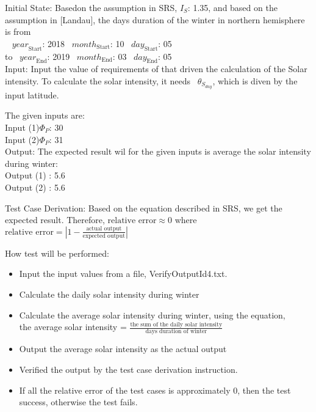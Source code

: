 \documentclass[12pt, titlepage]{article}
\begin{document}
\begin{enumerate}
Initial State:
Basedon the assumption in SRS\cite{YS2019}, $I_{S}$: 1.35, and based on the
assumption in [Landau\cite{Charles2001}], the days duration of the winter in
northern hemisphere is from\\
~ $\mathit{year}_\text{Start}$: 2018
~$\mathit{month}_\text{Start}$: 10 
~$\mathit{day}_\text{Start}$: 05 \\
 to
~$\mathit{year}_\text{End}$: 2019 
~$\mathit{month}_\text{End}$: 03
~$\mathit{day}_\text{End}$: 05\\

 Input: Input the value of requirements of
\progname that driven the calculation of the Solar intensity. To calculate the
solar intensity, it needs ~$\theta_{S_{day}}$, which is diven by the input
latitude. 

The given inputs are:\\ 
Input (1)$\Phi_P$: 30 \\ 
Input (2)$\Phi_P$: 31\\

Output: The expected result wil for the given inputs is average the solar
intensity during winter:\\ 
Output (1) : 5.6\\ 
Output (2) : 5.6\\



Test Case Derivation: Based on the equation described in SRS\cite{YS2019}, we
get the expected result. Therefore, $\text{relative error} \approx 0$ where
$\text{relative error} = | 1 - \frac{\text{actual output}}{ \text{expected
output}} |$ 


How test will be performed: 

\begin{itemize} 
\item Input the input values from a file, VerifyOutputId4.txt. 
\item Calculate the daily solar intensity during winter 
\item Calculate the average solar intensity during winter, using the equation,\\the average solar intensity = $\frac{\text{the sum of the daily solar
intensity}}{\text{days duration of winter}}$
\item Output the average solar intensity as the actual output
\item Verified the output by the test case derivation instruction. 
\item If all the relative error of the test cases is approximately 0, then the
test success, otherwise the test fails.
\end{itemize}
\end{enumerate}
\end{document}
